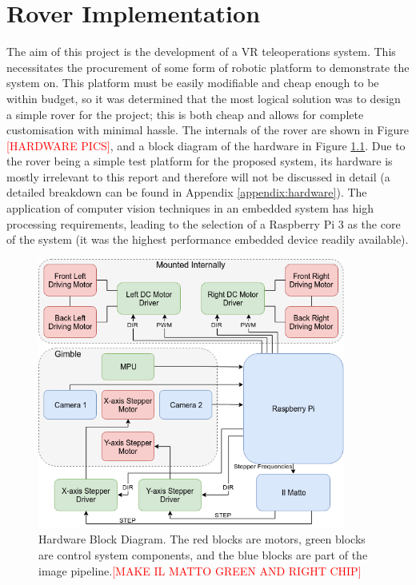\chapter{Rover Implementation}
\label{chapter:rover}

The aim of this project is the development of a VR teleoperations system. This necessitates the procurement of some form of robotic platform to demonstrate the system on. This platform must be easily modifiable and cheap enough to be within budget, so it was determined that the most logical solution was to design a simple rover for the project; this is both cheap and allows for complete customisation with minimal hassle. The internals of the rover are shown in Figure \textcolor{red}{[HARDWARE PICS]}, and a block diagram of the hardware in Figure \ref{fig:hardware}. Due to the rover being a simple test platform for the proposed system, its hardware is mostly irrelevant to this report and therefore will not be discussed in detail (a detailed breakdown can be found in Appendix \ref{appendix:hardware}). The application of computer vision techniques in an embedded system has high processing requirements, leading to the selection of a Raspberry Pi 3 as the core of the system (it was the highest performance embedded device readily available). 

\begin{figure}[H]
    \begin{center}
      \includegraphics[width=0.9\textwidth]{Figures/hardware.png}
      \caption[Hardware Block Diagram]{Hardware Block Diagram. The red blocks are motors, green blocks are control system components, and the blue blocks are part of the image pipeline.\textcolor{red}{[MAKE IL MATTO GREEN AND RIGHT CHIP]}}
      \label{fig:hardware}
    \end{center}
\end{figure}

